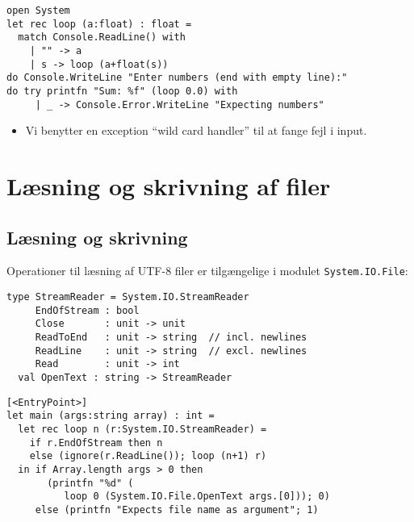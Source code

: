 \documentclass[rgb]{beamer}
\begin{document}
\begin{frame}[fragile]
\begin{footnotesize}


\begin{lstlisting}[numbers=none,frame=none,mathescape]
open System
let rec loop (a:float) : float =
  match Console.ReadLine() with
    | "" -> a
    | s -> loop (a+float(s))
do Console.WriteLine "Enter numbers (end with empty line):"
do try printfn "Sum: %f" (loop 0.0) with
     | _ -> Console.Error.WriteLine "Expecting numbers"
\end{lstlisting}


\begin{itemize}
\item Vi benytter en exception ``wild card handler'' til at fange fejl
  i input.
\end{itemize}

\end{footnotesize}
\end{frame}

\section{Læsning og skrivning af filer}

\subsection{Læsning og skrivning}
\begin{frame}[fragile]
\begin{footnotesize}


  Operationer til læsning af UTF-8 filer er tilgængelige i modulet \texttt{System.IO.File}:

\begin{lstlisting}[numbers=none,frame=none,mathescape]
  type StreamReader = System.IO.StreamReader
     EndOfStream : bool
     Close       : unit -> unit
     ReadToEnd   : unit -> string  // incl. newlines
     ReadLine    : unit -> string  // excl. newlines
     Read        : unit -> int
  val OpenText : string -> StreamReader
\end{lstlisting}


\begin{lstlisting}[numbers=none,frame=none,mathescape]
[<EntryPoint>]
let main (args:string array) : int =
  let rec loop n (r:System.IO.StreamReader) =
    if r.EndOfStream then n
    else (ignore(r.ReadLine()); loop (n+1) r)
  in if Array.length args > 0 then
       (printfn "%d" (
          loop 0 (System.IO.File.OpenText args.[0])); 0)
     else (printfn "Expects file name as argument"; 1)
\end{lstlisting}

\end{footnotesize}
\end{frame}
\end{document}
